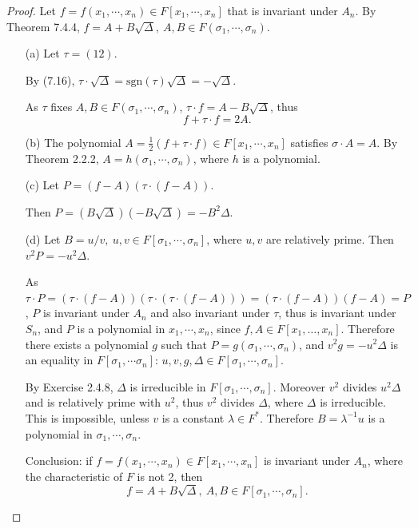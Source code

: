 \documentclass[11pt,a4paper]{article}
\begin{document}
\begin{proof}
Let  $f = f(x_1,\cdots,x_n) \in F[x_1,\cdots,x_n]$ that is invariant under $A_n$.
By Theorem 7.4.4, $f=A + B\sqrt{\Delta}, \ A,B \in F(\sigma_1,\cdots,\sigma_n)$.
\begin{enumerate}
\item[(a)] Let $\tau = (1 2)$.

By (7.16),  $\tau \cdot\sqrt{\Delta} = \mathrm{sgn}(\tau) \sqrt{\Delta} = - \sqrt{\Delta}$.

As $\tau$  fixes $A,B \in F(\sigma_1,\cdots,\sigma_n)$, $\tau \cdot f = A - B \sqrt{\Delta}$, thus
$$f + \tau \cdot f = 2 A.$$

\item[(b)] The polynomial $A =\frac{1}{2} (  f + \tau \cdot f) \in F[x_1,\cdots,x_n]$ satisfies $\sigma \cdot A = A$. By Theorem 2.2.2, $A = h(\sigma_1, \cdots,\sigma_n)$, where $h$ is a polynomial. 

\item[(c)] Let $P = (f-A)(\tau\cdot(f-A))$.

Then $P = (B\sqrt{\Delta})(-B \sqrt{\Delta}) = -B^2 \Delta$.

\item[(d)] Let $B = u/v, \ u,v \in F[\sigma_1,\cdots,\sigma_n]$, where $u,v$ are relatively prime. Then $v^2 P = -u^2 \Delta$.

As $\tau \cdot P = (\tau\cdot(f-A))(\tau \cdot(\tau\cdot(f-A))) = (\tau\cdot(f-A))(f-A) = P$, $P$ is invariant under $A_n$ and also invariant under $\tau$, thus is invariant under $S_n$, and $P$ is a polynomial in $x_1,\cdots,x_n$, since $f, A \in F[x_1,\ldots,x_n]$. Therefore there exists a polynomial $g$ such that $P = g(\sigma_1, \cdots, \sigma_n)$, and 
$v^2 g = -u^2 \Delta$ is an equality in $F[\sigma_1, \cdots \sigma_n]$: $u,v,g,\Delta \in F[\sigma_1,\cdots,\sigma_n]$.

By Exercise 2.4.8, $\Delta$ is irreducible in $F[\sigma_1,\cdots, \sigma_n]$. Moreover $v^2$ divides $u^2 \Delta$ and is relatively prime with $u^2$, thus $v^2$ divides $\Delta$, where $\Delta$ is irreducible. This is impossible, unless $v$ is a constant $\lambda \in F^*$. Therefore $B = \lambda^{-1} u$ is a polynomial in $\sigma_1,\cdots,\sigma_n$.

Conclusion: if  $f = f(x_1,\cdots,x_n) \in F[x_1,\cdots,x_n]$ is invariant under $A_n$, where the characteristic of $F$ is not 2,
then  $$f=A + B\sqrt{\Delta}, \ A,B \in F[\sigma_1,\cdots,\sigma_n].$$

\end{enumerate}
\end{proof}
\end{document}
